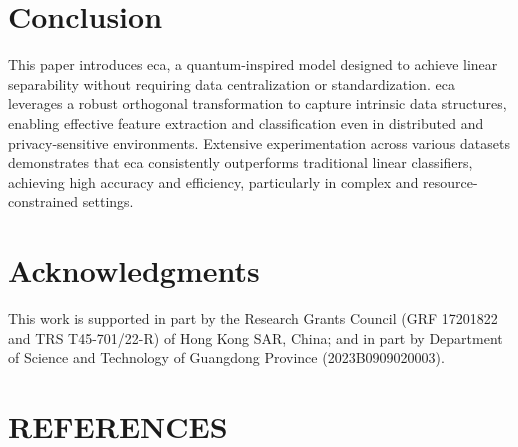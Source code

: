 \documentclass[lettersize,journal]{IEEEtran}
\begin{document}
\section{Conclusion}

This paper introduces \Gls{eca}, a quantum-inspired model designed to achieve linear separability without requiring data centralization or standardization. \Gls{eca} leverages a robust orthogonal transformation to capture intrinsic data structures, enabling effective feature extraction and classification even in distributed and privacy-sensitive environments. Extensive experimentation across various datasets demonstrates that \Gls{eca} consistently outperforms traditional linear classifiers, achieving high accuracy and efficiency, particularly in complex and resource-constrained settings.

\section*{Acknowledgments}
This work is supported in part by the Research Grants Council (GRF 17201822 and TRS T45-701/22-R) of Hong Kong SAR, China; and in part by Department of Science
and Technology of Guangdong Province (2023B0909020003).






\section{REFERENCES}


\vfill
\end{document}
